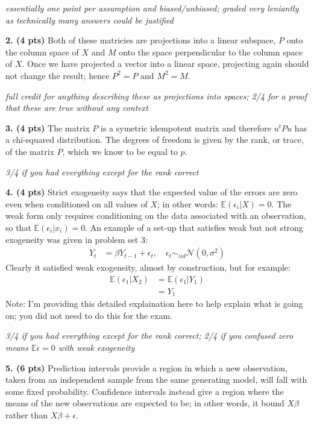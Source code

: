 \documentclass[12pt]{article}
\begin{document}
{\it essentially one point per assumption and biased/unbiased; graded very leniantly
as technically many answers could be justified}

{\bf 2. (4 pts)} Both of these matricies are projections into a linear subspace, $P$ onto the
column space of $X$ and $M$ onto the space perpendicular to the column space of $X$.
Once we have projected a vector into a linear space, projecting again should not
change the result; hence $P^2=P$ and $M^2=M$.

{\it full credit for anything describing these as projections into spaces; 2/4 for a
proof that these are true without any context}

{\bf 3. (4 pts)} The matrix $P$ is a symetric idempotent matrix and therefore $u^t P u$ has
a chi-squared distribution. The degrees of freedom is given by the rank, or trace,
of the matrix $P$, which we know to be equal to $p$.

{\it 3/4 if you had everything except for the rank correct}

{\bf 4. (4 pts)} Strict exogeneity says that the expected value of the errors are zero even
when conditioned on all values of $X$; in other words: $\mathbb{E} (\epsilon_i | X) = 0$.
The weak form only requires conditioning on the data associated with an observation,
so that $\mathbb{E} (\epsilon_i | x_i) = 0$. An example of a set-up that satisfies
weak but not strong exogeneity was given in problem set 3:
\begin{align*}
Y_t &= \beta Y_{t-1} + \epsilon_t, \quad \epsilon_t \sim_{iid} \mathcal{N} (0, \sigma^2)
\end{align*}
Clearly it satisfied weak exogeneity, almost by construction, but for example:
\begin{align*}
\mathbb{E} ( \epsilon_1 | X_2 ) &= \mathbb{E} ( \epsilon_1 | Y_1 ) \\
&= Y_1
\end{align*}
Note: I'm providing this detailed explaination here to help explain what is
going on; you did not need to do this for the exam.

{\it 3/4 if you had everything except for the rank correct; 2/4 if you confused
zero means $\mathbb{E} \epsilon = 0$ with weak exogeneity}

{\bf 5. (6 pts)} Prediction intervals provide a region in which a new observation, taken
from an independent sample from the same generating model, will fall with some
fixed probability. Confidence intervals instead give a region where the means
of the new observations are expected to be; in other words, it bound $X\beta$
rather than $X\beta + \epsilon$.
\end{document}
